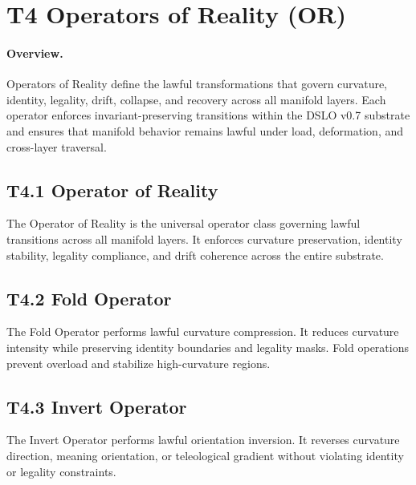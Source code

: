 
\section{T4 Operators of Reality (OR)}

\paragraph{Overview.}
Operators of Reality define the lawful transformations that govern curvature,
identity, legality, drift, collapse, and recovery across all manifold layers.
Each operator enforces invariant-preserving transitions within the DSLO v0.7
substrate and ensures that manifold behavior remains lawful under load,
deformation, and cross-layer traversal.

\subsection{T4.1 Operator of Reality}
The Operator of Reality is the universal operator class governing lawful
transitions across all manifold layers. It enforces curvature preservation,
identity stability, legality compliance, and drift coherence across the entire
substrate.

\subsection{T4.2 Fold Operator}
The Fold Operator performs lawful curvature compression. It reduces curvature
intensity while preserving identity boundaries and legality masks. Fold
operations prevent overload and stabilize high-curvature regions.

\subsection{T4.3 Invert Operator}
The Invert Operator performs lawful orientation inversion. It reverses
curvature direction, meaning orientation, or teleological gradient without
violating identity or legality constraints.

